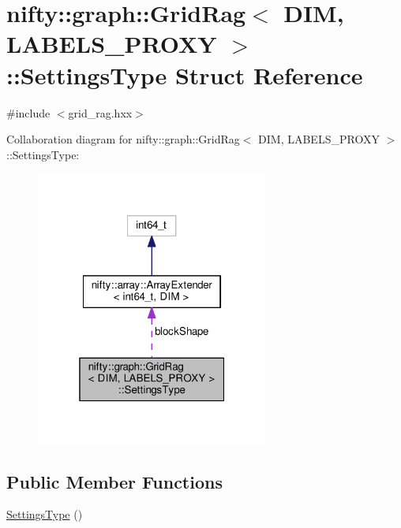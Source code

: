 \hypertarget{structnifty_1_1graph_1_1GridRag_1_1SettingsType}{}\section{nifty\+:\+:graph\+:\+:Grid\+Rag$<$ D\+I\+M, L\+A\+B\+E\+L\+S\+\_\+\+P\+R\+O\+X\+Y $>$\+:\+:Settings\+Type Struct Reference}
\label{structnifty_1_1graph_1_1GridRag_1_1SettingsType}


{\ttfamily \#include $<$grid\+\_\+rag.\+hxx$>$}



Collaboration diagram for nifty\+:\+:graph\+:\+:Grid\+Rag$<$ D\+I\+M, L\+A\+B\+E\+L\+S\+\_\+\+P\+R\+O\+X\+Y $>$\+:\+:Settings\+Type\+:\nopagebreak
\begin{figure}[H]
\begin{center}
\leavevmode
\includegraphics[width=217pt]{structnifty_1_1graph_1_1GridRag_1_1SettingsType__coll__graph}
\end{center}
\end{figure}
\subsection*{Public Member Functions}
\begin{DoxyCompactItemize}
\item 
\hyperlink{structnifty_1_1graph_1_1GridRag_1_1SettingsType_a635006df3b75d3bbeaec306efef6ca8e}{Settings\+Type} ()
\end{DoxyCompactItemize}
